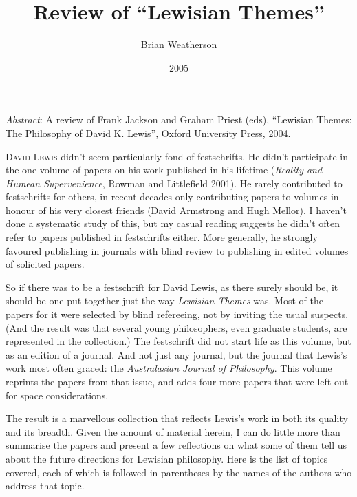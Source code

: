 \documentclass[
  11pt,
  letterpaper,
  DIV=11,
  numbers=noendperiod,
  twoside]{scrartcl}
\title{Review of ``Lewisian Themes''}
\author{Brian Weatherson}
\date{2005}
\renewenvironment{abstract}
 {\vspace{-1.25cm}
 \quotation\small\noindent\emph{Abstract}:}
 {\endquotation}
\renewenvironment{abstract}
 {\quotation\small\noindent\emph{Abstract}:}
 {\endquotation\vspace{-0.02cm}}
\begin{document}
\maketitle
\begin{abstract}
A review of Frank Jackson and Graham Priest (eds), ``Lewisian Themes:
The Philosophy of David K. Lewis'', Oxford University Press, 2004.
\end{abstract}


\lettrine{D}{avid Lewis} didn't seem particularly fond of festschrifts.
He didn't participate in the one volume of papers on his work published
in his lifetime (\emph{Reality and Humean Supervenience}, Rowman and
Littlefield 2001). He rarely contributed to festschrifts for others, in
recent decades only contributing papers to volumes in honour of his very
closest friends (David Armstrong and Hugh Mellor). I haven't done a
systematic study of this, but my casual reading suggests he didn't often
refer to papers published in festschrifts either. More generally, he
strongly favoured publishing in journals with blind review to publishing
in edited volumes of solicited papers.

So if there was to be a festschrift for David Lewis, as there surely
should be, it should be one put together just the way \emph{Lewisian
Themes} was. Most of the papers for it were selected by blind
refereeing, not by inviting the usual suspects. (And the result was that
several young philosophers, even graduate students, are represented in
the collection.) The festschrift did not start life as this volume, but
as an edition of a journal. And not just any journal, but the journal
that Lewis's work most often graced: the \emph{Australasian Journal of
Philosophy}. This volume reprints the papers from that issue, and adds
four more papers that were left out for space considerations.

The result is a marvellous collection that reflects Lewis's work in both
its quality and its breadth. Given the amount of material herein, I can
do little more than summarise the papers and present a few reflections
on what some of them tell us about the future directions for Lewisian
philosophy. Here is the list of topics covered, each of which is
followed in parentheses by the names of the authors who address that
topic.
\end{document}
